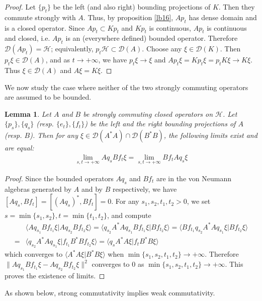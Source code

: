 \documentclass[12pt,a4paper]{article}
\theoremstyle{definition}
\theoremstyle{plain}
\newtheorem{lm}[df]{Lemma}
\newcommand{\mc}{\mathcal}
\newcommand{\Dom}{\scr D}
\newcommand{\bk}[1]{\langle {#1}\rangle}
\newcommand{\scr}{\mathscr}
\numberwithin{equation}{subsection}
\begin{document}
\begin{subappendices}
\begin{proof}
	Let $\{p_t\}$ be the left (and also right) bounding projections of $K$. Then they commute strongly with $A$. Thus, by proposition \ref{lb16}, $Ap_t$ has dense domain and is a closed operator. Since $Ap_t\subset Kp_t$ and $Kp_t$ is continuous, $Ap_t$ is  continuous and closed, i.e. $Ap_t$ is an (everywhere defined) bounded operator. Therefore $\Dom(Ap_t)=\mc H$; equivalently, $p_t\mc H\subset\Dom(A)$. Choose any $\xi\in\Dom(K)$. Then $p_t\xi\in\Dom(A)$, and as $t\rightarrow+\infty$, we have $p_t\xi\rightarrow\xi$ and  $Ap_t\xi=Kp_t\xi=p_tK\xi\rightarrow K\xi$. Thus $\xi\in\Dom(A)$ and $A\xi=K\xi$.
\end{proof}




We now study the case where neither of the two strongly commuting operators are assumed to be bounded.


\begin{lm}\label{lb4}
	Let $A$ and $B$ be strongly commuting closed operators on $\mc H$. Let $\{p_s\},\{q_s\}$ (resp. $\{e_t\},\{f_t\}$) be the left and the right bounding projections of $A$ (resp. $B$). Then for any $\xi\in\Dom(A^*A)\cap\Dom(B^*B)$, the following limits exist and are equal:
	\begin{align}
	\lim_{s,t\rightarrow+\infty}Aq_sBf_t\xi=\lim_{s,t\rightarrow+\infty}Bf_tAq_s\xi\label{eq3}
	\end{align}
\end{lm}


\begin{proof}
	Since the bounded operators $Aq_s$ and $Bf_t$ are in the von Neumann algebras generated by $A$ and by $B$ respectively, we have $[Aq_s,Bf_t]=[(Aq_s)^*,Bf_t]=0$. 	For any $s_1,s_2,t_1,t_2>0$, we set $s=\min\{s_1,s_2\},t=\min\{t_1,t_2\}$, and compute
	\begin{align*}
	&\bk{Aq_{s_1}Bf_{t_1}\xi|Aq_{s_2}Bf_{t_2}\xi}=\bk{q_{s_2}A^*Aq_{s_1}Bf_{t_1}\xi|Bf_{t_2}\xi}=\bk{Bf_{t_1}q_{s_2}A^*Aq_{s_1}\xi|Bf_{t_2}\xi}\\
	=&\bk{q_{s_2}A^*Aq_{s_1}\xi|f_{t_1}B^*Bf_{t_2}\xi}=\bk{q_sA^*A\xi|f_tB^*B\xi}
	\end{align*}
	which converges to $\bk{A^*A\xi|B^*B\xi}$ when $\min\{s_1,s_2,t_1,t_2\}\rightarrow+\infty$. Therefore $\lVert Aq_{s_1}Bf_{t_1}\xi- Aq_{s_2}Bf_{t_2}\xi\lVert^2$ converges to $0$ as $\min\{s_1,s_2,t_1,t_2\}\rightarrow+\infty$. This proves the existence of limits.
\end{proof}


As shown below, strong commutativity implies weak commutativity.


\end{subappendices}
\end{document}
